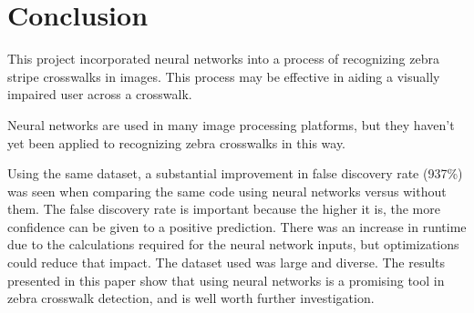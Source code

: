 \chapter{Conclusion}
\label{conclusion}

This project incorporated neural networks into a process of recognizing zebra stripe crosswalks in images. This process may be effective in aiding a visually impaired user across a crosswalk. 

Neural networks are used in many image processing platforms, but they haven't yet been applied to recognizing zebra crosswalks in this way.


Using the same dataset, a substantial improvement in false discovery rate (937\%) was seen when comparing the same code using neural networks versus without them. The false discovery rate is important because the higher it is, the more confidence can be given to a positive prediction. There was an increase in runtime due to the calculations required for the neural network inputs, but optimizations could reduce that impact. The dataset used was large and diverse. The results presented in this paper show that using neural networks is a promising tool in zebra crosswalk detection, and is well worth further investigation.